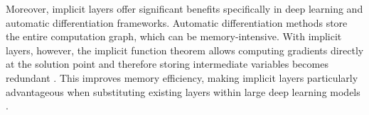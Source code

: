 Moreover, implicit layers offer significant benefits specifically in deep learning and automatic differentiation frameworks. Automatic differentiation methods store the entire computation graph, which can be memory-intensive. With implicit layers, however, the implicit function theorem allows computing gradients directly at the solution point and therefore storing intermediate variables becomes redundant \citep{Massaroli2021}. This improves memory efficiency, making implicit layers particularly advantageous when substituting existing layers within large deep learning models \citep{Li2020}.
